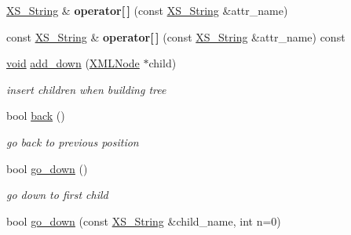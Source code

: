 \begin{DoxyCompactItemize}
\hyperlink{struct_x_m_l_storage_1_1_x_s___string}{X\+S\+\_\+\+String} \& {\bfseries operator\mbox{[}$\,$\mbox{]}} (const \hyperlink{struct_x_m_l_storage_1_1_x_s___string}{X\+S\+\_\+\+String} \&attr\+\_\+name)
\item 
\mbox{\label{struct_x_m_l_storage_1_1_x_m_l_pos_ad41bc343976e43fa7c4e8f9ef567cf39}} 
const \hyperlink{struct_x_m_l_storage_1_1_x_s___string}{X\+S\+\_\+\+String} \& {\bfseries operator\mbox{[}$\,$\mbox{]}} (const \hyperlink{struct_x_m_l_storage_1_1_x_s___string}{X\+S\+\_\+\+String} \&attr\+\_\+name) const
\item 
\mbox{\label{struct_x_m_l_storage_1_1_x_m_l_pos_a4495221f95008850c42eebd2033373cb}} 
\hyperlink{interfacevoid}{void} \hyperlink{struct_x_m_l_storage_1_1_x_m_l_pos_a4495221f95008850c42eebd2033373cb}{add\+\_\+down} (\hyperlink{struct_x_m_l_storage_1_1_x_m_l_node}{X\+M\+L\+Node} $\ast$child)
\begin{DoxyCompactList}\small\item\em insert children when building tree \end{DoxyCompactList}\item 
\mbox{\label{struct_x_m_l_storage_1_1_x_m_l_pos_a2928e19460b5b66771f0947d3241c21c}} 
bool \hyperlink{struct_x_m_l_storage_1_1_x_m_l_pos_a2928e19460b5b66771f0947d3241c21c}{back} ()
\begin{DoxyCompactList}\small\item\em go back to previous position \end{DoxyCompactList}\item 
\mbox{\label{struct_x_m_l_storage_1_1_x_m_l_pos_a4645d68e3521372efd497315ff96a9d0}} 
bool \hyperlink{struct_x_m_l_storage_1_1_x_m_l_pos_a4645d68e3521372efd497315ff96a9d0}{go\+\_\+down} ()
\begin{DoxyCompactList}\small\item\em go down to first child \end{DoxyCompactList}\item 
\mbox{\label{struct_x_m_l_storage_1_1_x_m_l_pos_ae95314588d4e37732bdd5fe410890a8e}} 
bool \hyperlink{struct_x_m_l_storage_1_1_x_m_l_pos_ae95314588d4e37732bdd5fe410890a8e}{go\+\_\+down} (const \hyperlink{struct_x_m_l_storage_1_1_x_s___string}{X\+S\+\_\+\+String} \&child\+\_\+name, int n=0)

\end{DoxyCompactItemize}
